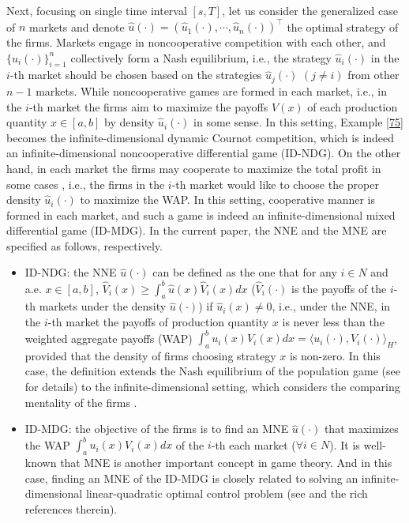 \documentclass[10pt]{article}
\begin{document}
Next, focusing on single time interval $[s,T]$, let us consider the generalized case  of $n$ markets and denote $\widehat{u}(\cdot)=(\widehat{u}_1(\cdot),\cdots,\widehat{u}_n(\cdot))^{\top}$  the optimal strategy of the firms.  Markets engage in noncooperative competition with each other, and  $\{\widehat{u}_i(\cdot)\}_{i=1}^n$ collectively form a Nash equilibrium, i.e.,  the strategy $\widehat{u}_i(\cdot)$ in the $i$-th market should be chosen based on the strategies $\widehat{u}_j(\cdot)$ $(j\neq i)$ from other $n-1$ markets. While noncooperative  games are formed in each market, i.e., in the $i$-th market the firms aim to maximize the payoffs $V(x)$ of each production quantity $x\in [a,b]$ by density $\widehat{u}_i(\cdot)$ in some sense. In this setting, Example \ref{75} becomes the  infinite-dimensional dynamic Cournot competition, which is indeed an infinite-dimensional noncooperative differential  game (ID-NDG).  On the other hand, in each market the firms  may cooperate   to maximize the total profit in some cases  \citep{MR4704225, MR4550673}, i.e., the firms in the $i$-th market would like to choose the proper density $\widehat{u}_i(\cdot)$  to maximize the WAP. In this setting, cooperative manner is formed in each market, and such a game is indeed an infinite-dimensional  mixed differential game (ID-MDG).  In the current paper, the NNE   and the MNE are specified as  follows, respectively.
 \begin{itemize}
 \item ID-NDG: the NNE $\widehat{u}(\cdot)$  can be defined as the one that for any $i\in N $ and a.e. $x\in[a,b]$, $\widehat{V}_i(x)\geq\int_a^b\widehat{u}(x)\widehat{V}_i(x)dx$ ($\widehat{V}_i(\cdot)$ is the  payoffs of the $i$-th markets under the density $\widehat{u}(\cdot)$) if $\widehat{u}_i(x)\neq0$, i.e., under the NNE, in the $i$-th market the  payoffs  of    production quantity $x$   is  never less  than the weighted aggregate payoffs (WAP)      $\int_a^bu_i(x)V_i(x)dx=\langle u_i(\cdot),V_i(\cdot)\rangle_H$, provided that the density of firms choosing strategy $x$ is non-zero. In this case, the  definition extends the Nash equilibrium of the population game (see \citep{como2020imitation, mertikopoulos2018riemannian, MR2560519} for details) to the infinite-dimensional setting, which considers the comparing mentality of the firms \citep{Espinosa2015Optimal, Lacker2020Many}.

\item    ID-MDG: the objective of the firms is to find an MNE $\widehat{u}(\cdot)$ that maximizes  the WAP $\int_a^bu_i(x)V_i(x)dx$ of the $i$-th each market ($\forall i\in N$). It is well-known that   MNE  is another important concept in game theory. And in this case, finding an MNE of the ID-MDG is closely related to solving an infinite-dimensional linear-quadratic optimal control problem (see \citep{MR4572454, MR4363403} and the rich references therein).
 \end{itemize}
\end{document}
